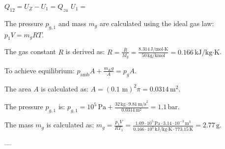 \( Q_{12} = U_{Z} - U_{1} = Q_{zu} \)  
\( U_1 = \)

The pressure \( p_{g,1} \) and mass \( m_g \) are calculated using the ideal gas law:  
\( p_1 V = m_g R T \).  

The gas constant \( R \) is derived as:  
\( R = \frac{\bar{R}}{M_g} = \frac{8.314 \, \text{J/mol·K}}{50 \, \text{kg/kmol}} = 0.166 \, \text{kJ/kg·K} \).  

To achieve equilibrium:  
\( p_{\text{amb}} A + \frac{m_K g}{A} = p_g A \).  

The area \( A \) is calculated as:  
\( A = (\text{0.1 m})^2 \pi = 0.0314 \, \text{m}^2 \).  

The pressure \( p_{g,1} \) is:  
\( p_{g,1} = 10^5 \, \text{Pa} + \frac{32 \, \text{kg} \cdot 9.81 \, \text{m/s}^2}{0.0314 \, \text{m}^2} = 1.1 \, \text{bar} \).  

The mass \( m_g \) is calculated as:  
\( m_g = \frac{p_1 V}{R T_1} = \frac{1.09 \cdot 10^5 \, \text{Pa} \cdot 3.14 \cdot 10^{-3} \, \text{m}^3}{0.166 \cdot 10^3 \, \text{kJ/kg·K} \cdot 773.15 \, \text{K}} = 2.77 \, \text{g} \).  

---